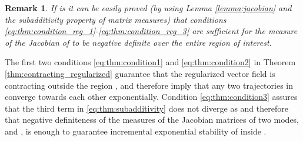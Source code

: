 \documentclass[twocolumn]{autart}
\newtheorem{remark}{Remark}
\begin{document}
\begin{remark}
If  is  it can be easily proved (by using Lemma \ref{lemma:jacobian} and the subadditivity property of matrix measures) that conditions \eqref{eq:thm:condition_reg_1}-\eqref{eq:thm:condition_reg_3} are sufficient for the measure of the Jacobian of  to be negative definite over the entire region of interest.
\end{remark}
The first two conditions \eqref{eq:thm:condition1} and \eqref{eq:thm:condition2} in Theorem \ref{thm:contracting_regularized} guarantee that the regularized vector field  is contracting outside the region , and therefore imply that any two trajectories in  converge towards each other exponentially. Condition \eqref{eq:thm:condition3} assures that the third term in \eqref{eq:thm:subadditivity} does not diverge as  and therefore that negative definiteness of the measures of the Jacobian matrices of two modes,  and , is enough to guarantee incremental exponential stability of  inside . 
\end{document}
